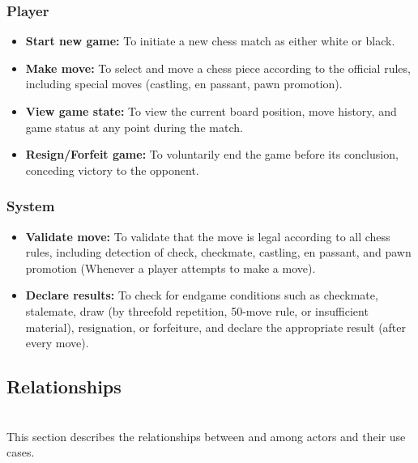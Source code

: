 \subsubsection{Player}\label{NvyJu0pj2CA0B4OGX7Knq}

\begin{itemize}
\item
\protect{}\label{6ITMFRTODQs2SFnNBsjep}
\textbf{Start new game:} To initiate a new chess match as either white or black.
\item
\protect{}\label{W_Ddgv8BZAgd815S0DnlX}
\textbf{Make move:} To select and move a chess piece according to the official rules, including special moves (castling, en passant, pawn promotion).
\item
\protect{}\label{pn7DwgAb2Y8OJEqYRRxHc}
\textbf{View game state:} To view the current board position, move history, and game status at any point during the match.
\item
\protect{}\label{ZNruKBGBLMLwbK7wzJV2V}
\textbf{Resign/Forfeit game:} To voluntarily end the game before its conclusion, conceding victory to the opponent.
\end{itemize}

\subsubsection{System}\label{QUvq4TdHfEO-B7LdJs3Q2}

\begin{itemize}
\item
\protect{}\label{uemNdDI7G3l81t8d-Kz8c}
\textbf{Validate move:} To validate that the move is legal according to all chess rules, including detection of check, checkmate, castling, en passant, and pawn promotion (Whenever a player attempts to make a move).
\item
\protect{}\label{8h1BzMzYFQLhWGpzJH5L3}
\textbf{Declare results:} To check for endgame conditions such as checkmate, stalemate, draw (by threefold repetition, 50-move rule, or insufficient material), resignation, or forfeiture, and declare the appropriate result (after every move).
\end{itemize}

\subsection{Relationships}\label{8f2eAXwLH3_G9icGNs2jX}
\\
This section describes the relationships between and among actors and their use cases.

